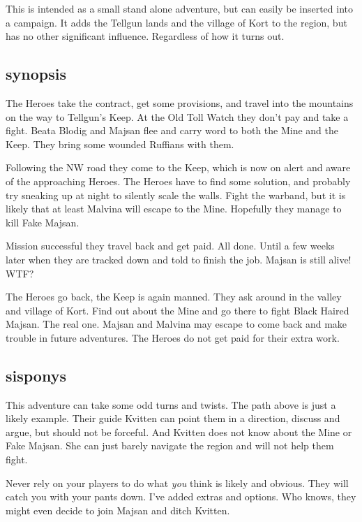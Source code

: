 \vspace{2.0\baselineskip}


\noindent
This is intended as a small stand alone adventure, but can easily be inserted into a campaign. It adds the Tellgun lands and the village of Kort to the region, but has no other significant influence. Regardless of how it turns out.


\subsection*{synopsis}
The Heroes take the contract, get some provisions, and travel into the mountains on the way to Tellgun's Keep. At the Old Toll Watch they don't pay and take a fight. Beata Blodig and Majsan flee and carry word to both the Mine and the Keep. They bring some wounded Ruffians with them.

Following the NW road they come to the Keep, which is now on alert and aware of the approaching Heroes. The Heroes have to find some solution, and probably try sneaking up at night to silently scale the walls. Fight the warband, but it is likely that at least Malvina will escape to the Mine. Hopefully they manage to kill Fake Majsan.

Mission successful they travel back and get paid. All done. Until a few weeks later when they are tracked down and told to finish the job. Majsan is still alive! WTF?

The Heroes go back, the Keep is again manned. They ask around in the valley and village of Kort. Find out about the Mine and go there to fight Black Haired Majsan. The real one. Majsan and Malvina may escape to come back and make trouble in future adventures. The Heroes do not get paid for their extra work.


\subsection*{sisponys}
This adventure can take some odd turns and twists. The path above is just a likely example. Their guide Kvitten can point them in a direction, discuss and argue, but should not be forceful. And Kvitten does not know about the Mine or Fake Majsan. She can just barely navigate the region and will not help them fight.

Never rely on your players to do what \textit{you} think is likely and obvious. They will catch you with your pants down. I've added extras and options. Who knows, they might even decide to join Majsan and ditch Kvitten.


